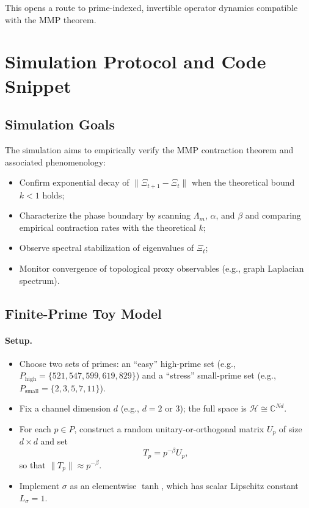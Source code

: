 \documentclass[12pt]{article}
\begin{document}
This opens a route to prime-indexed, invertible operator dynamics compatible with the MMP theorem.

\newpage

\section{Simulation Protocol and Code Snippet}

\subsection{Simulation Goals}

The simulation aims to empirically verify the MMP contraction theorem and associated phenomenology:

\begin{itemize}
  \item Confirm exponential decay of \(\|\Xi_{t+1}-\Xi_t\|\) when the theoretical bound \(k<1\) holds;
  \item Characterize the phase boundary by scanning \(\Lambda_m\), \(\alpha\), and \(\beta\) and comparing empirical contraction rates with the theoretical \(k\);
  \item Observe spectral stabilization of eigenvalues of \(\Xi_t\);
  \item Monitor convergence of topological proxy observables (e.g., graph Laplacian spectrum).
\end{itemize}

\subsection{Finite-Prime Toy Model}

\paragraph{Setup.}

\begin{itemize}
  \item Choose two sets of primes: an ``easy'' high-prime set (e.g., \(P_{\mathrm{high}} = \{521,547,599,619,829\}\)) and a ``stress'' small-prime set (e.g., \(P_{\mathrm{small}} = \{2,3,5,7,11\}\)).
  \item Fix a channel dimension \(d\) (e.g., \(d=2\) or \(3\)); the full space is \(\mathcal{H}\cong \mathbb{C}^{Nd}\).
  \item For each \(p\in P\), construct a random unitary-or-orthogonal matrix \(U_p\) of size \(d \times d\) and set
  \[
    T_p = p^{-\beta} U_p,
  \]
  so that \(\|T_p\|\approx p^{-\beta}\).
  \item Implement \(\sigma\) as an elementwise \(\tanh\), which has scalar Lipschitz constant \(L_\sigma=1\).
\end{itemize}
\end{document}
